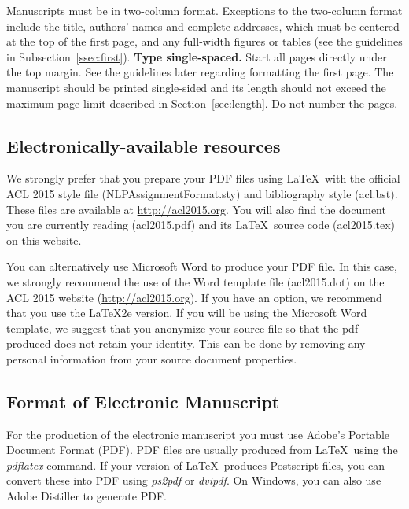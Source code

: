 \documentclass[11pt]{article}
\begin{document}
Manuscripts must be in two-column format.  Exceptions to the
two-column format include the title, authors' names and complete
addresses, which must be centered at the top of the first page, and
any full-width figures or tables (see the guidelines in
Subsection~\ref{ssec:first}). {\bf Type single-spaced.}  Start all
pages directly under the top margin. See the guidelines later
regarding formatting the first page.  The manuscript should be
printed single-sided and its length
should not exceed the maximum page limit described in Section~\ref{sec:length}.
Do not number the pages.


\subsection{Electronically-available resources}

We strongly prefer that you prepare your PDF files using \LaTeX\ with
the official ACL 2015 style file (NLPAssignmentFormat.sty) and bibliography style
(acl.bst). These files are available at
\url{http://acl2015.org}. You will also find the document
you are currently reading (acl2015.pdf) and its \LaTeX\ source code
(acl2015.tex) on this website.

You can alternatively use Microsoft Word to produce your PDF file. In
this case, we strongly recommend the use of the Word template file
(acl2015.dot) on the ACL 2015 website (\url{http://acl2015.org}).
If you have an option, we recommend that you use the \LaTeX2e version.
If you will be using the Microsoft Word template, we suggest that you
anonymize your source file so that the pdf produced does not retain your
identity.  This can be done by removing any personal information
from your source document properties.



\subsection{Format of Electronic Manuscript}
\label{sect:pdf}

For the production of the electronic manuscript you must use Adobe's
Portable Document Format (PDF). PDF files are usually produced from
\LaTeX\ using the \textit{pdflatex} command. If your version of
\LaTeX\ produces Postscript files, you can convert these into PDF
using \textit{ps2pdf} or \textit{dvipdf}. On Windows, you can also use
Adobe Distiller to generate PDF.
\end{document}
